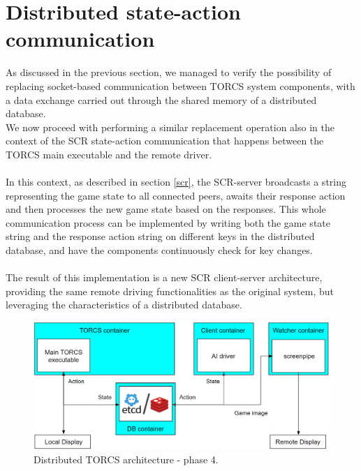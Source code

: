 \section{Distributed state-action communication}\label{DDB-SA-communication}
As discussed in the previous section, we managed to verify the possibility of replacing socket-based communication between TORCS system components, with a data exchange carried out through the shared memory of a distributed database. \\
We now proceed with performing a similar replacement operation also in the context of the SCR state-action communication that happens between the TORCS main executable and the remote driver. \\ \\
In this context, as described in section \ref{scr}, the SCR-server broadcasts a string representing the game state to all connected peers, awaits their response action and then processes the new game state based on the responses. This whole communication process can be implemented by writing both the game state string and the response action string on different keys in the distributed database, and have the components continuously check for key changes. \\ \\
The result of this implementation is a new SCR client-server architecture, providing the same remote driving functionalities as the original system, but leveraging the characteristics of a distributed database.
\begin{figure}[h!]
	\centering
	\includegraphics[width=0.9\linewidth]{"immagini/Software development/Development-4"}
	\caption[Distributed TORCS architecture - phase 4.]{Distributed TORCS architecture - phase 4.}
	\label{fig:development-4}
\end{figure}


